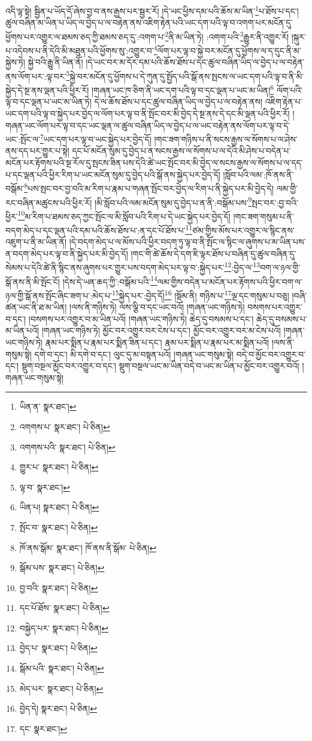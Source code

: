 འདི་ལྟ་སྟེ། སྦྱིན་པ་ཡོད་དོ་ཞེས་བྱ་བ་ནས་རྒྱས་པར་སྦྱར་རོ། །དེ་ཡང་ཕྱིས་དམ་པའི་ཆོས་མ་ཡིན་\footnote{ཡིན་ན་  སྣར་ཐང་། }པ་ཐོས་པ་དང་། ཚུལ་བཞིན་མ་ཡིན་པ་ཡིད་ལ་བྱེད་པ་ལ་བརྟེན་ནས་འཇིག་རྟེན་པའི་ཡང་དག་པའི་ལྟ་བ་འགག་པར་མངོན་དུ་ཕྱོགས་པར་འགྱུར་ལ་ཐམས་ཅད་ཀྱི་ཐམས་ཅད་དུ་:འགག་པ་\footnote{འགགས་པ་  སྣར་ཐང་།  པེ་ཅིན། }ནི་མ་ཡིན་ཏེ། :འགག་པའི་\footnote{འགགས་པའི་  སྣར་ཐང་།  པེ་ཅིན། }རྒྱུར་ནི་འགྱུར་རོ། །སྐུར་པ་འདེབས་པ་ནི་དེའི་མི་མཐུན་པའི་ཕྱོགས་སུ་:འགྱུར་བ་\footnote{གྱུར་པ་  སྣར་ཐང་།  པེ་ཅིན། }ལོག་པར་ལྟ་བ་སྐྱེ་བར་མངོན་དུ་ཕྱོགས་ལ་ད་དུང་ནི་མ་སྐྱེས་ཏེ། སྐྱེ་བའི་རྒྱུ་ནི་ཡིན་ནོ། །དེ་ཡང་བར་མ་དོར་དམ་པའི་ཆོས་ཐོས་པ་དང་ཚུལ་བཞིན་ཡིད་ལ་བྱེད་པ་ལ་བརྟེན་ནས་ལོག་པར་:ལྟ་བར་\footnote{ལྟ་བ་  སྣར་ཐང་། }སྐྱེ་བར་མངོན་དུ་ཕྱོགས་པ་དེ་ཀུན་དུ་སྤྱོད་པའི་སྒོ་ནས་སྤངས་ལ་ཡང་དག་པའི་ལྟ་བ་ནི་མི་སྐྱེད་དེ་སྔ་ནས་ལྡན་པའི་ཕྱིར་རོ། །གཞན་ཡང་ཁ་ཅིག་ནི་ཡང་དག་པའི་ལྟ་བ་དང་ལྡན་པ་ཡང་མ་ཡིན།\footnote{ཡིན་པ།  སྣར་ཐང་།  པེ་ཅིན། } ལོག་པའི་ལྟ་བ་དང་ལྡན་པ་ཡང་མ་ཡིན་ཏེ། དེ་ལ་ཆོས་ཐོས་པ་དང་ཚུལ་བཞིན་ཡིད་ལ་བྱེད་པ་ལ་བརྟེན་ནས། འཇིག་རྟེན་པ་ཡང་དག་པའི་ལྟ་བ་སྐྱེད་པར་བྱེད་ལ་ལོག་པར་ལྟ་བ་ནི་སྤོང་བར་མི་བྱེད་དེ་སྔ་ནས་དེ་དང་མི་ལྡན་པའི་ཕྱིར་རོ། །གཞན་ཡང་ལོག་པར་ལྟ་བ་དང་ཡང་ལྡན་ལ་ཚུལ་བཞིན་ཡིད་ལ་བྱེད་པ་ལ་ཡང་བརྟེན་ནས་ལོག་པར་ལྟ་བ་དེ་ཡང་:སྤོང་ལ་\footnote{སྤོང་བ་  སྣར་ཐང་།  པེ་ཅིན། }ཡང་དག་པར་ལྟ་བ་ཡང་སྐྱེད་པར་བྱེད་དོ། །གང་ཟག་གཉིས་པ་ནི་སངས་རྒྱས་ལ་སོགས་པ་ལ་ཤེས་ནས་དད་པར་གྱུར་པ་སྟེ། དང་པོ་མངོན་སུམ་དུ་བྱེད་པ་ན་སངས་རྒྱས་ལ་སོགས་པ་ལ་དེའི་མི་ཤེས་པ་བདེན་པ་མངོན་པར་རྟོགས་པའི་སྔ་རོལ་དུ་སྤངས་ཟིན་པས་དེའི་ཚེ་ཡང་སྤོང་བར་མི་བྱེད་ལ་སངས་རྒྱས་ལ་སོགས་པ་ལ་དད་པ་དང་ལྡན་པའི་ཕྱིར་རིག་པ་ཡང་མངོན་སུམ་དུ་བྱེད་པའི་སྒོ་ནས་སྐྱེད་པར་བྱེད་དོ། །སློབ་པའི་ལམ་:ཁོ་ནས་ནི་བསྒོམ་\footnote{ཁོ་ནས་སྒོམ་  སྣར་ཐང་། ཁོ་ནས་ནི་སྒོམ་  པེ་ཅིན། }པས་སྤང་བར་བྱ་བའི་མ་རིག་པ་རྣམ་པ་གཞན་སྤོང་བར་བྱེད་ལ་རིག་པ་ནི་སྐྱེད་པར་མི་བྱེད་དེ། ལམ་གྱི་རང་བཞིན་མཚུངས་པའི་ཕྱིར་རོ། །མི་སློབ་པའི་ལམ་མངོན་སུམ་དུ་བྱེད་པ་ན་ནི་:བསྒོམ་པས་\footnote{སྒོམ་པས་  སྣར་ཐང་།  པེ་ཅིན། }སྤང་བར་:བྱ་བའི་ཕྱིར་\footnote{བྱ་བའི་  སྣར་ཐང་།  པེ་ཅིན། }མ་རིག་པ་ཐམས་ཅད་ཀྱང་སྤོང་ལ་མི་སློབ་པའི་རིག་པ་དེ་ཡང་སྐྱེད་པར་བྱེད་དོ། །གང་ཟག་གསུམ་པ་ནི་བདག་མེད་པ་དང་ལྡན་པའི་དམ་པའི་ཆོས་ཐོས་པ་:ན་དང་པོ་ཐོས་པ་\footnote{དང་པོ་ཐོས་  སྣར་ཐང་།  པེ་ཅིན། }ཙམ་གྱིས་མོས་པར་འགྱུར་ལ་སྙིང་ནས་འཇུག་པ་ནི་མ་ཡིན་ནོ། །དེ་བདག་མེད་པ་ལ་མོས་པའི་ཕྱིར་བདག་ཏུ་ལྟ་བ་ནི་སྤོང་ལ་སྙིང་ལ་ཞུགས་པ་མ་ཡིན་པས་ན་བདག་མེད་པར་ལྟ་བ་ནི་སྐྱེད་པར་མི་བྱེད་དོ། །གང་གི་ཚེ་ཆོས་དེ་དག་ཇི་ལྟར་ཐོས་པ་བཞིན་དུ་ཚུལ་བཞིན་དུ་སེམས་པ་དེའི་ཚེ་ནི་སྙིང་ནས་ཞུགས་པར་གྱུར་པས་བདག་མེད་པར་ལྟ་བ་:སྐྱེད་པར་\footnote{བསྐྱེད་པར་  སྣར་ཐང་།  པེ་ཅིན། }:བྱེད་ལ་\footnote{བྱེད་པ་  སྣར་ཐང་།  པེ་ཅིན། }བག་ལ་ཉལ་གྱི་སྒོ་ནས་ནི་མི་སྤོང་ངོ། །དེས་དེ་ཡན་ཆད་ཀྱི་:བསྒོམ་པའི་\footnote{སྒོམ་པའི་  སྣར་ཐང་།  པེ་ཅིན། }ལམ་གྱིས་བདེན་པ་མངོན་པར་རྟོགས་པའི་ཕྱིར་བག་ལ་ཉལ་གྱི་སྒོ་ནས་སྤོང་ཞིང་ཟག་པ་:མེད་པ་\footnote{མེད་པར་  སྣར་ཐང་།  པེ་ཅིན། }སྐྱེད་པར་:བྱེད་དོ།\footnote{བྱེད་དེ།  སྣར་ཐང་།  པེ་ཅིན། } །སྡོམ་ནི། གཉིས་པ་\footnote{དང་  སྣར་ཐང་། }ལྔ་དང་གསུམ་པ་བཅུ། །བཞི་ཚན་ཡང་ནི་ཐ་མ་ཡིན། །ལས་ནི་གཉིས་ཏེ། ལས་ལྕི་བ་དང་ཡང་བའོ། །གཞན་ཡང་གཉིས་ཏེ། བསགས་པར་འགྱུར་བ་དང་། །བསགས་པར་འགྱུར་བ་མ་ཡིན་པའོ། །གཞན་ཡང་གཉིས་ཏེ། ཆེད་དུ་བསམས་པ་དང་། ཆེད་དུ་བསམས་པ་མ་ཡིན་པའོ། །གཞན་ཡང་གཉིས་ཏེ། མྱོང་བར་འགྱུར་བར་ངེས་པ་དང་། མྱོང་བར་འགྱུར་བར་མ་ངེས་པའོ། །གཞན་ཡང་གཉིས་ཏེ། རྣམ་པར་སྨིན་པ་རྣམ་པར་སྨིན་ཟིན་པ་དང་། རྣམ་པར་སྨིན་པ་རྣམ་པར་མ་སྨིན་པའོ། །ལས་ནི་གསུམ་སྟེ། དགེ་བ་དང་། མི་དགེ་བ་དང་། ལུང་དུ་མ་བསྟན་པའོ། །གཞན་ཡང་གསུམ་སྟེ། བདེ་བ་མྱོང་བར་འགྱུར་བ་དང་། སྡུག་བསྔལ་མྱོང་བར་འགྱུར་བ་དང་། སྡུག་བསྔལ་ཡང་མ་ཡིན་བདེ་བ་ཡང་མ་ཡིན་པ་མྱོང་བར་འགྱུར་བའོ། །གཞན་ཡང་གསུམ་སྟེ། 